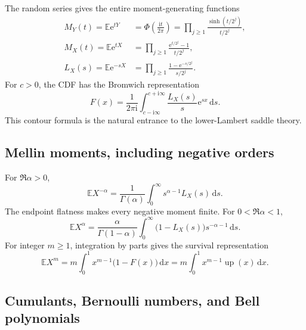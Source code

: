 \documentclass[11pt,oneside]{article}
\theoremstyle{definition}
\theoremstyle{remark}
\newcommand{\E}{\mathbb E}
\newcommand{\Up}{\operatorname{up}}
\newcommand{\e}{\mathrm e}
\newcommand{\ii}{\mathrm i}
\newcommand{\dd}{\,\mathrm d}
\begin{document}
The random series gives the entire moment-generating functions
\begin{align}
 M_Y(t)=\E\e^{tY}
 &=\Phi\left(\frac{\ii t}{2\pi}\right)
 =\prod_{j\ge1}\frac{\sinh(t/2^j)}{t/2^j},               \label{eq:MY}\\
 M_X(t)=\E\e^{tX}
 &=\prod_{j\ge1}\frac{\e^{t/2^j}-1}{t/2^j},             \label{eq:MX}\\
 L_X(s)=\E\e^{-sX}
 &=\prod_{j\ge1}\frac{1-\e^{-s/2^j}}{s/2^j}.           \label{eq:LX}
\end{align}
For $c>0$, the CDF has the Bromwich representation
\begin{equation}
 F(x)=\frac{1}{2\pi\ii}\int_{c-\ii\infty}^{c+\ii\infty}
 \frac{L_X(s)}{s}\e^{sx}\dd s.                          \label{eq:F-Bromwich}
\end{equation}
This contour formula is the natural entrance to the lower-Lambert saddle theory.

\subsection{Mellin moments, including negative orders}

For $\Re\alpha>0$,
\begin{equation}
 \E X^{-\alpha}=\frac{1}{\Gamma(\alpha)}
 \int_0^\infty s^{\alpha-1}L_X(s)\dd s.                 \label{eq:negative-moment-Mellin}
\end{equation}
The endpoint flatness makes every negative moment finite.  For $0<\Re\alpha<1$,
\begin{equation}
 \E X^{\alpha}=\frac{\alpha}{\Gamma(1-\alpha)}
 \int_0^\infty\bigl(1-L_X(s)\bigr)s^{-\alpha-1}\dd s. \label{eq:positive-fractional-moment}
\end{equation}
For integer $m\ge1$, integration by parts gives the survival representation
\begin{equation}
 \E X^m=m\int_0^1x^{m-1}\bigl(1-F(x)\bigr)\dd x
 =m\int_0^1x^{m-1}\Up(x)\dd x.                          \label{eq:moments-survival}
\end{equation}

\subsection{Cumulants, Bernoulli numbers, and Bell polynomials}
\end{document}
